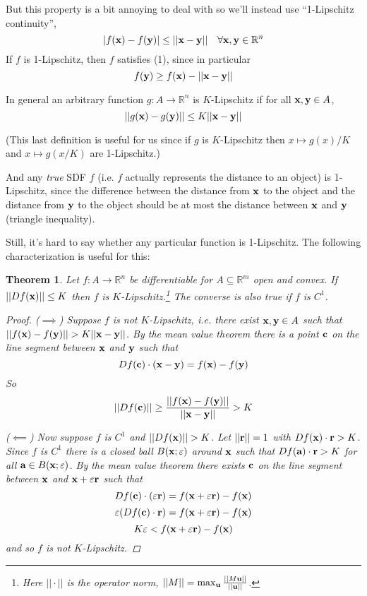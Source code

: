 \documentclass{article}
\newcommand\bb\mathbb
\newcommand\ve\varepsilon
\renewcommand\vec\textbf
\newtheorem{theorem}{Theorem}
\begin{document}
But this property is a bit annoying to deal with
so we'll instead use ``1-Lipschitz continuity'',
$$|f(\vec x) - f(\vec y)| \leq ||\vec x - \vec y||~~~\forall \vec x,\vec y\in\bb R^n$$
If $f$ is 1-Lipschitz, then $f$ satisfies (1),
since in particular
$$f(\vec y) \geq f(\vec x) - ||\vec x-\vec y||$$

In general an arbitrary function $g:A \to\bb R^n$ is
$K$-Lipschitz if for all $\vec x,\vec y\in A$,
$$||g(\vec x) - g(\vec y)|| \leq K||\vec x-\vec y||$$

(This last definition is useful for us since if $g$ is $K$-Lipschitz
then $x\mapsto g(x)/K$ and $x\mapsto g(x/K)$ are 1-Lipschitz.)

And any {\em true} SDF $f$ (i.e. $f$ actually represents
the distance to an object) is 1-Lipschitz, since the difference
between the distance from $\vec x$ to the object and the distance
from $\vec y$ to the object should be at most the distance between
$\vec x$ and $\vec y$ (triangle inequality).

Still, it's hard to say whether any particular function is
1-Lipschitz. The following characterization is useful for this:

\begin{theorem}
\label{diff-lipschitz}
Let $f:A\to\bb R^n$ be differentiable for $A\subseteq \bb R^m$ open and convex.
If $||Df(\vec x)||\leq K$ then $f$ is $K$-Lipschitz.\footnote{Here
$||\cdot||$ is the operator norm, $||M|| = \max_{\vec u} \frac{||M\vec u||}{||\vec u||}$.}
The converse is also true if $f$ is $C^1$.
\begin{proof}
($\implies$) Suppose $f$ is not $K$-Lipschitz, i.e. there exist $\vec x,\vec y\in A$ such that
$||f(\vec x)-f(\vec y)|| >  K ||\vec x-\vec y||$. By the mean value theorem there is a point $\vec c$
on the line segment between $\vec x$ and $\vec y$ such that
$$Df(\vec c)\cdot (\vec x-\vec y) = f(\vec x) - f(\vec y)$$
So
$$||Df(\vec c)|| \geq  \frac{||f(\vec x) - f(\vec y)||}{||\vec x-\vec y||} > K$$

($\impliedby$) Now suppose $f$ is $C^1$ and $||Df(\vec x)|| > K$.
Let $||\vec r|| = 1$ with $Df(\vec x)\cdot \vec r > K$.
Since $f$ is $C^1$ there is a closed ball $B(\vec x;\ve)$ around $\vec x$ such that
$Df(\vec a)\cdot \vec r > K$ for all $\vec a\in B(\vec x;\ve)$.
By the mean value theorem there exists $\vec c$ on the line segment between $\vec x$ and $\vec x+\ve\vec r$
such that
$$Df(\vec c)\cdot (\ve\vec r) = f(\vec x+\ve\vec r) - f(\vec x)$$
$$\ve (Df(\vec c)\cdot \vec r) = f(\vec x+\ve\vec r) - f(\vec x)$$
$$K\ve < f(\vec x+\ve\vec r) - f(\vec x)$$
and so $f$ is not $K$-Lipschitz.
\end{proof}
\end{theorem}
\end{document}

